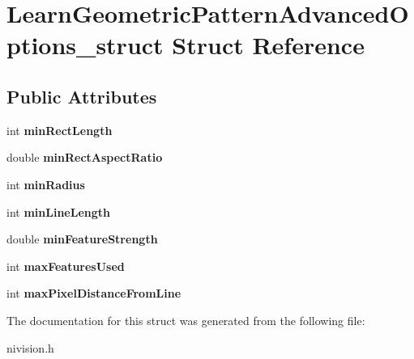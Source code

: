 \hypertarget{structLearnGeometricPatternAdvancedOptions__struct}{
\section{LearnGeometricPatternAdvancedOptions\_\-struct Struct Reference}
\label{structLearnGeometricPatternAdvancedOptions__struct}
}
\subsection*{Public Attributes}
\begin{DoxyCompactItemize}
\item 
\hypertarget{structLearnGeometricPatternAdvancedOptions__struct_a4a205923a89132ff0d1ddb23e5fc81cb}{
int {\bfseries minRectLength}}
\label{structLearnGeometricPatternAdvancedOptions__struct_a4a205923a89132ff0d1ddb23e5fc81cb}

\item 
\hypertarget{structLearnGeometricPatternAdvancedOptions__struct_a36f89f85b3efb21e2b83471f4bdecb9c}{
double {\bfseries minRectAspectRatio}}
\label{structLearnGeometricPatternAdvancedOptions__struct_a36f89f85b3efb21e2b83471f4bdecb9c}

\item 
\hypertarget{structLearnGeometricPatternAdvancedOptions__struct_a576fc2b10d00707c1c7b326ade74d152}{
int {\bfseries minRadius}}
\label{structLearnGeometricPatternAdvancedOptions__struct_a576fc2b10d00707c1c7b326ade74d152}

\item 
\hypertarget{structLearnGeometricPatternAdvancedOptions__struct_ad638184835077c0d1b7abbae21b1cd5d}{
int {\bfseries minLineLength}}
\label{structLearnGeometricPatternAdvancedOptions__struct_ad638184835077c0d1b7abbae21b1cd5d}

\item 
\hypertarget{structLearnGeometricPatternAdvancedOptions__struct_a2faeca0343c8f44311025f617d3ffa11}{
double {\bfseries minFeatureStrength}}
\label{structLearnGeometricPatternAdvancedOptions__struct_a2faeca0343c8f44311025f617d3ffa11}

\item 
\hypertarget{structLearnGeometricPatternAdvancedOptions__struct_a1c5ab25ab5536056703f20c706fca235}{
int {\bfseries maxFeaturesUsed}}
\label{structLearnGeometricPatternAdvancedOptions__struct_a1c5ab25ab5536056703f20c706fca235}

\item 
\hypertarget{structLearnGeometricPatternAdvancedOptions__struct_a5a2150d8c00370109cf36a5c13b047df}{
int {\bfseries maxPixelDistanceFromLine}}
\label{structLearnGeometricPatternAdvancedOptions__struct_a5a2150d8c00370109cf36a5c13b047df}

\end{DoxyCompactItemize}


The documentation for this struct was generated from the following file:\begin{DoxyCompactItemize}
\item 
nivision.h\end{DoxyCompactItemize}
